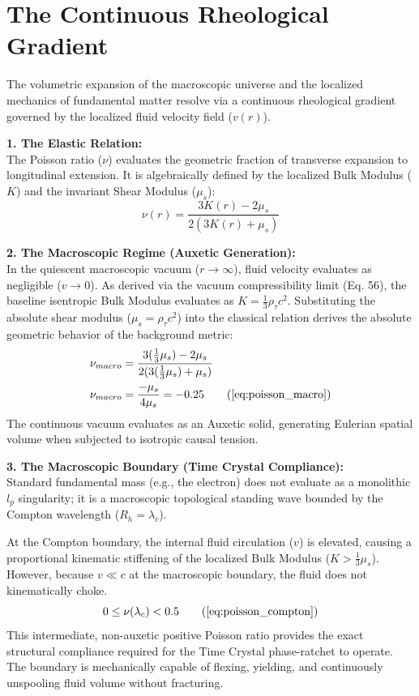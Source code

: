 \documentclass[11pt, a4paper]{article}
\begin{document}
\section{The Continuous Rheological Gradient}
\label{sec:deriv_rheological_gradient}

The volumetric expansion of the macroscopic universe and the localized mechanics of fundamental matter resolve via a continuous rheological gradient governed by the localized fluid velocity field ($v(r)$). 

\textbf{1. The Elastic Relation:} \\
The Poisson ratio ($\nu$) evaluates the geometric fraction of transverse expansion to longitudinal extension. It is algebraically defined by the localized Bulk Modulus ($K$) and the invariant Shear Modulus ($\mu_s$):
\begin{equation}
    \nu(r) = \frac{3K(r) - 2\mu_s}{2(3K(r) + \mu_s)} 
\end{equation}

\textbf{2. The Macroscopic Regime (Auxetic Generation):} \\
In the quiescent macroscopic vacuum ($r \to \infty$), fluid velocity evaluates as negligible ($v \to 0$). As derived via the vacuum compressibility limit (Eq. 56), the baseline isentropic Bulk Modulus evaluates as $K = \frac{1}{3}\rho_{\tau} c^2$. Substituting the absolute shear modulus ($\mu_s = \rho_{\tau} c^2$) into the classical relation derives the absolute geometric behavior of the background metric:
\begin{align}
    \nu_{macro} &= \frac{3(\frac{1}{3}\mu_s) - 2\mu_s}{2(3(\frac{1}{3}\mu_s) + \mu_s)}  \\
    \nu_{macro} &= \frac{-\mu_s}{4\mu_s} = -0.25 \tag{\ref{eq:poisson_macro}}
\end{align}
The continuous vacuum evaluates as an Auxetic solid, generating Eulerian spatial volume when subjected to isotropic causal tension.

\textbf{3. The Macroscopic Boundary (Time Crystal Compliance):} \\
Standard fundamental mass (e.g., the electron) does not evaluate as a monolithic $l_p$ singularity; it is a macroscopic topological standing wave bounded by the Compton wavelength ($R_h = \lambda_c$). 

At the Compton boundary, the internal fluid circulation ($v$) is elevated, causing a proportional kinematic stiffening of the localized Bulk Modulus ($K > \frac{1}{3}\mu_s$). However, because $v \ll c$ at the macroscopic boundary, the fluid does not kinematically choke. 
\begin{equation}
    0 \le \nu(\lambda_c) < 0.5 \tag{\ref{eq:poisson_compton}}
\end{equation}
This intermediate, non-auxetic positive Poisson ratio provides the exact structural compliance required for the Time Crystal phase-ratchet to operate. The boundary is mechanically capable of flexing, yielding, and continuously unspooling fluid volume without fracturing.
\end{document}
